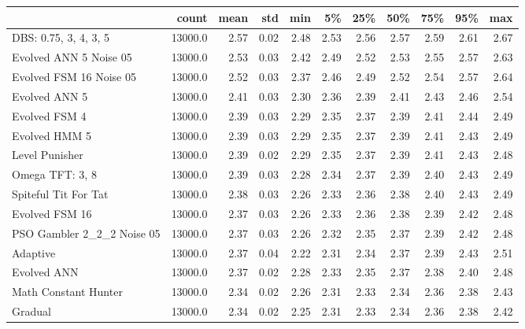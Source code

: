 \begin{tabular}{lrrrrrrrrrr}
\toprule
{} &    count &  mean &   std &   min &    5\% &   25\% &   50\% &   75\% &   95\% &   max \\
\midrule
DBS: 0.75, 3, 4, 3, 5      &  13000.0 &  2.57 &  0.02 &  2.48 &  2.53 &  2.56 &  2.57 &  2.59 &  2.61 &  2.67 \\
Evolved ANN 5 Noise 05     &  13000.0 &  2.53 &  0.03 &  2.42 &  2.49 &  2.52 &  2.53 &  2.55 &  2.57 &  2.63 \\
Evolved FSM 16 Noise 05    &  13000.0 &  2.52 &  0.03 &  2.37 &  2.46 &  2.49 &  2.52 &  2.54 &  2.57 &  2.64 \\
Evolved ANN 5              &  13000.0 &  2.41 &  0.03 &  2.30 &  2.36 &  2.39 &  2.41 &  2.43 &  2.46 &  2.54 \\
Evolved FSM 4              &  13000.0 &  2.39 &  0.03 &  2.29 &  2.35 &  2.37 &  2.39 &  2.41 &  2.44 &  2.49 \\
Evolved HMM 5              &  13000.0 &  2.39 &  0.03 &  2.29 &  2.35 &  2.37 &  2.39 &  2.41 &  2.43 &  2.49 \\
Level Punisher             &  13000.0 &  2.39 &  0.02 &  2.29 &  2.35 &  2.37 &  2.39 &  2.41 &  2.43 &  2.48 \\
Omega TFT: 3, 8            &  13000.0 &  2.39 &  0.03 &  2.28 &  2.34 &  2.37 &  2.39 &  2.40 &  2.43 &  2.49 \\
Spiteful Tit For Tat       &  13000.0 &  2.38 &  0.03 &  2.26 &  2.33 &  2.36 &  2.38 &  2.40 &  2.43 &  2.49 \\
Evolved FSM 16             &  13000.0 &  2.37 &  0.03 &  2.26 &  2.33 &  2.36 &  2.38 &  2.39 &  2.42 &  2.48 \\
PSO Gambler 2\_2\_2 Noise 05 &  13000.0 &  2.37 &  0.03 &  2.26 &  2.32 &  2.35 &  2.37 &  2.39 &  2.42 &  2.48 \\
Adaptive                   &  13000.0 &  2.37 &  0.04 &  2.22 &  2.31 &  2.34 &  2.37 &  2.39 &  2.43 &  2.51 \\
Evolved ANN                &  13000.0 &  2.37 &  0.02 &  2.28 &  2.33 &  2.35 &  2.37 &  2.38 &  2.40 &  2.48 \\
Math Constant Hunter       &  13000.0 &  2.34 &  0.02 &  2.26 &  2.31 &  2.33 &  2.34 &  2.36 &  2.38 &  2.43 \\
Gradual                    &  13000.0 &  2.34 &  0.02 &  2.25 &  2.31 &  2.33 &  2.34 &  2.36 &  2.38 &  2.42 \\
\bottomrule
\end{tabular}
